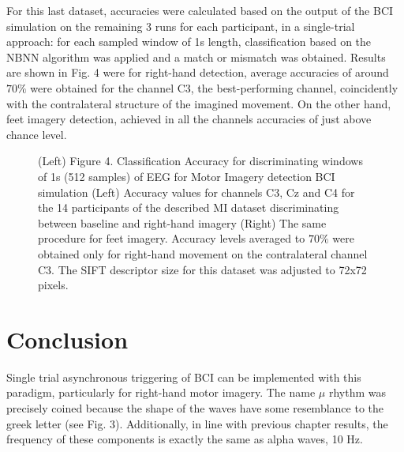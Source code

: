 For this last dataset, accuracies were calculated based on the output of the BCI simulation on the remaining 3 runs for each participant, in a single-trial approach: for each sampled window of 1s length, classification based on the NBNN algorithm was applied and a match or mismatch was obtained.  Results are shown in Fig. 4 were for right-hand detection, average accuracies of around $70\%$ were obtained for the channel C3, the best-performing channel, coincidently with the contralateral structure of the imagined movement.  On the other hand, feet imagery detection, achieved in all the channels accuracies of just above chance level.

  \begin{figure}[thpb]
      \centering
      \setlength\fboxsep{0pt}
	  \setlength\fboxrule{0.5pt}
      \caption[Alpha Waves Classification]{(Left) Figure 4. 	Classification Accuracy for discriminating windows of 1s (512 samples) of EEG for Motor Imagery detection BCI simulation (Left) Accuracy values for channels C3, Cz and C4 for the 14 participants of the described MI dataset discriminating between baseline and right-hand imagery (Right) The same procedure for feet imagery. Accuracy levels averaged to $70\%$ were obtained only for right-hand movement on the contralateral channel C3. The SIFT descriptor size for this dataset was adjusted to 72x72 pixels.}
      \label{figure1}
   \end{figure}
   
   
\section{Conclusion}

Single trial asynchronous triggering of BCI can be implemented with this paradigm, particularly for right-hand motor imagery. The name $\mu$ rhythm was precisely coined because the shape of the waves have some resemblance to the greek letter (see Fig. 3).  Additionally, in line with previous chapter results, the frequency of these components is exactly the same as alpha waves, 10 Hz.
